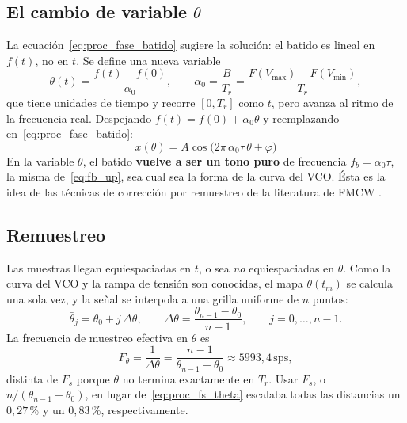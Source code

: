 \subsection{El cambio de variable $\theta$}

La ecuación~\eqref{eq:proc_fase_batido} sugiere la solución: el batido es
lineal en $f(t)$, no en $t$. Se define una nueva variable
\begin{equation}
  \theta(t) = \frac{f(t) - f(0)}{\alpha_0},
  \qquad \alpha_0 = \frac{B}{T_r} = \frac{F(V_\text{max}) - F(V_\text{min})}{T_r},
  \label{eq:proc_theta}
\end{equation}
que tiene unidades de tiempo y recorre $[0, T_r]$ como $t$, pero avanza al
ritmo de la frecuencia real. Despejando $f(t) = f(0) + \alpha_0\theta$ y
reemplazando en~\eqref{eq:proc_fase_batido}:
\begin{equation}
  \boxed{\;
    x(\theta) = A\cos\!\bigl(2\pi\,\alpha_0\tau\,\theta + \varphi\bigr)
  \;}
  \label{eq:proc_tono_theta}
\end{equation}
En la variable $\theta$, el batido \textbf{vuelve a ser un tono puro} de
frecuencia $f_b = \alpha_0\tau$, la misma de~\eqref{eq:fb_up}, sea cual sea
la forma de la curva del VCO. Ésta es la idea de las técnicas de corrección
por remuestreo de la literatura de FMCW \cite{Stove1992, HALFMCWnolin}.

\subsection{Remuestreo}

Las muestras llegan equiespaciadas en $t$, o sea \emph{no} equiespaciadas en
$\theta$. Como la curva del VCO y la rampa de tensión son conocidas, el mapa
$\theta(t_m)$ se calcula una sola vez, y la señal se interpola a una grilla
uniforme de $n$ puntos:
\begin{equation}
  \bar\theta_j = \theta_0 + j\,\Delta\theta,\qquad
  \Delta\theta = \frac{\theta_{n-1} - \theta_0}{n-1},\qquad
  j = 0,\dots,n-1.
\end{equation}
La frecuencia de muestreo efectiva en $\theta$ es
\begin{equation}
  F_\theta = \frac{1}{\Delta\theta} = \frac{n-1}{\theta_{n-1}-\theta_0}
  \approx 5993{,}4\,\text{sps},
  \label{eq:proc_fs_theta}
\end{equation}
distinta de $F_s$ porque $\theta$ no termina exactamente en $T_r$. Usar
$F_s$, o $n/(\theta_{n-1}-\theta_0)$, en lugar de~\eqref{eq:proc_fs_theta}
escalaba todas las distancias un $0{,}27$\,\% y un $0{,}83$\,\%,
respectivamente.

